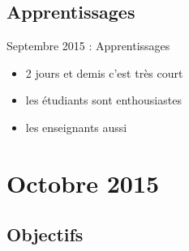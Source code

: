 \documentclass{beamer}
\begin{document}
\subsection{Apprentissages}
\begin{frame}{Septembre 2015 : Apprentissages}
  \begin{itemize}
    \item 2 jours et demis c'est très court
    \item les étudiants sont enthousiastes
    \item les enseignants aussi
  \end{itemize}
\end{frame}

\section{Octobre 2015}
\subsection{Objectifs}
\end{document}
